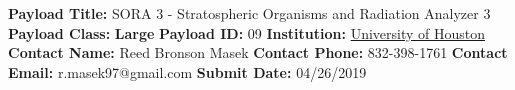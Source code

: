 \documentclass[aps,superscriptaddress,floatfix,nofootinbib,showpacs,amsmath,amssymb,altaffilletter,floatfix,onecolumn,rmp]{revtex4-1}
\begin{document}
\noindent\textbf{Payload Title:} SORA 3 - Stratospheric Organisms and Radiation Analyzer 3 \newline
\textbf{Payload Class:} \textbf{Large} \newline
\textbf{Payload ID:} \num{09} \newline
\textbf{Institution:} \underline{University of Houston} \newline
\textbf{Contact Name:} Reed Bronson Masek \newline
\textbf{Contact Phone:} 832-398-1761 \newline
\textbf{Contact Email:} r.masek97@gmail.com \newline
\textbf{Submit Date:} 04/26/2019 \newline

\setlength{\parindent}{1em}
\setdefaultleftmargin{1em}{1em}{}{}{}{}
\setcounter{page}{1}







\end{document}
